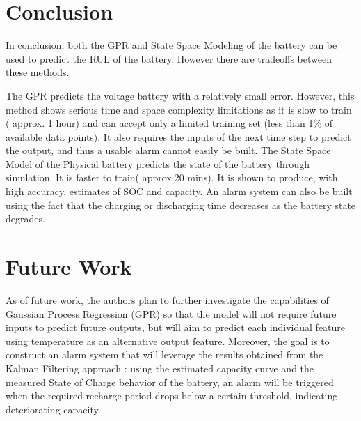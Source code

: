 \section{Conclusion}
In conclusion, both the GPR and State Space Modeling of the battery can be used to predict the RUL of the battery. However there are tradeoffs between these methods. 

The GPR predicts the voltage battery with a relatively small error. However, this method shows serious time and space complexity limitations as it is slow to train ( approx. 1 hour) and can accept only a limited training set (less than 1\% of available data points). It also requires the inputs of the next time step to predict the output, and thus a usable alarm cannot easily be built.
The State Space Model of the Physical battery predicts the state of the battery through simulation. It is faster to train( approx.20 mins). It is shown to produce, with high accuracy, estimates of SOC and capacity. An alarm system can also be built using the fact that the charging or discharging time decreases as the battery state degrades.

\section{Future Work}
As of future work, the authors plan to further investigate the capabilities of Gaussian Process Regression (GPR) so that the model will not require future inputs to predict future outputs, but will aim to predict each individual feature using temperature as an alternative output feature. Moreover, the goal is to construct an alarm system that will leverage the results obtained from the Kalman Filtering approach : using the estimated capacity curve and the measured State of Charge behavior of the battery, an alarm will be triggered when the required recharge period drops below a certain threshold, indicating deteriorating capacity.

 
 
